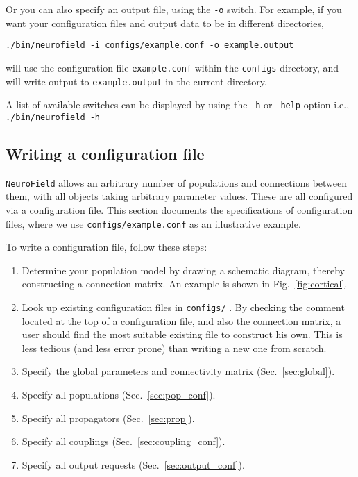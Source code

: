 \documentclass[12pt,a4paper]{article}
\newcommand{\type}[1]{{\small\small\tt #1} }
\newcommand{\NF}[0]{\type{NeuroField}}
\begin{document}
Or you can also specify an output file, using the \type{-o} switch. For example, if you want your configuration files and output data to be in different directories,

\begin{lstlisting}
./bin/neurofield -i configs/example.conf -o example.output
\end{lstlisting}

will use the configuration file \type{example.conf} within the \type{configs} directory, and will write output to \type{example.output} in the current directory.

A list of available switches can be displayed by using the \type{-h} or \type{--help} option i.e., \type{./bin/neurofield -h}

\subsection{Writing a configuration file}
\label{sec:config}

\NF allows an arbitrary number of populations and connections between them, with all objects taking arbitrary parameter values. These are all configured via a configuration file. This section documents the specifications of configuration files, where we use \type{configs/example.conf} as an illustrative example.

To write a configuration file, follow these steps:
\begin{enumerate}
\item Determine your population model by drawing a schematic diagram, thereby constructing a connection matrix. An example is shown in Fig.~\ref{fig:cortical}.
\item Look up existing configuration files in \type{configs/}. By checking the comment located at the top of a configuration file, and also the connection matrix, a user should find the most suitable existing file to construct his own. This is less tedious (and less error prone) than writing a new one from scratch.
\item Specify the global parameters and connectivity matrix (Sec.~\ref{sec:global}).
\item Specify all populations (Sec.~\ref{sec:pop_conf}).
\item Specify all propagators (Sec.~\ref{sec:prop}).
\item Specify all couplings (Sec.~\ref{sec:coupling_conf}).
\item Specify all output requests (Sec.~\ref{sec:output_conf}).
\end{enumerate}
\end{document}
